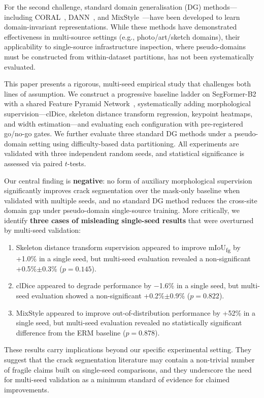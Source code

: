 \documentclass[preprint,12pt]{elsarticle}
\begin{document}
For the second challenge, standard domain generalisation (DG) methods---including CORAL~\cite{sun2016coral}, DANN~\cite{ganin2016dann}, and MixStyle~\cite{zhou2021mixstyle}---have been developed to learn domain-invariant representations. While these methods have demonstrated effectiveness in multi-source settings (e.g., photo/art/sketch domains), their applicability to single-source infrastructure inspection, where pseudo-domains must be constructed from within-dataset partitions, has not been systematically evaluated.

This paper presents a rigorous, multi-seed empirical study that challenges both lines of assumption. We construct a progressive baseline ladder on SegFormer-B2~\cite{xie2021segformer} with a shared Feature Pyramid Network~\cite{lin2017fpn}, systematically adding morphological supervision---clDice, skeleton distance transform regression, keypoint heatmaps, and width estimation---and evaluating each configuration with pre-registered go/no-go gates. We further evaluate three standard DG methods under a pseudo-domain setting using difficulty-based data partitioning. All experiments are validated with three independent random seeds, and statistical significance is assessed via paired $t$-tests.

Our central finding is \textbf{negative}: no form of auxiliary morphological supervision significantly improves crack segmentation over the mask-only baseline when validated with multiple seeds, and no standard DG method reduces the cross-site domain gap under pseudo-domain single-source training. More critically, we identify \textbf{three cases of misleading single-seed results} that were overturned by multi-seed validation:
\begin{enumerate}
    \item Skeleton distance transform supervision appeared to improve mIoU\textsubscript{fg} by +1.0\% in a single seed, but multi-seed evaluation revealed a non-significant +0.5\%$\pm$0.3\% ($p=0.145$).
    \item clDice appeared to degrade performance by $-$1.6\% in a single seed, but multi-seed evaluation showed a non-significant +0.2\%$\pm$0.9\% ($p=0.822$).
    \item MixStyle appeared to improve out-of-distribution performance by +52\% in a single seed, but multi-seed evaluation revealed no statistically significant difference from the ERM baseline ($p=0.878$).
\end{enumerate}

These results carry implications beyond our specific experimental setting. They suggest that the crack segmentation literature may contain a non-trivial number of fragile claims built on single-seed comparisons, and they underscore the need for multi-seed validation as a minimum standard of evidence for claimed improvements.
\end{document}

